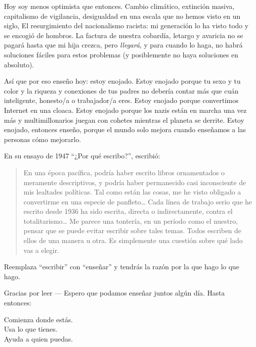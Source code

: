 Hoy soy menos optimista que entonces.
Cambio climático,
extinción masiva,
capitalismo de vigilancia,
desigualdad en una escala que no hemos visto en un siglo,
El resurgimiento del nacionalismo racista:
mi generación lo ha visto todo y se encogió de hombros.
La factura de nuestra cobardía, letargo y avaricia no se pagará hasta que mi hija crezca,
pero \emph{llegará},
y para cuando lo haga, no habrá soluciones fáciles para estos problemas
(y posiblemente no haya soluciones en absoluto).

Así que por eso enseño hoy:
estoy enojado.
Estoy enojado porque tu sexo y tu color y la riqueza y conexiones de tus padres
no debería contar más que cuán inteligente, honesto/a o trabajador/a eres.
Estoy enojado porque convertimos Internet en una cloaca.
Estoy enojado porque los nazis están en marcha una vez más
y multimillonarios juegan con cohetes mientras el planeta se derrite.
Estoy enojado,
entonces enseño,
porque el mundo solo mejora cuando enseñamos a las personas cómo mejorarlo.

En su ensayo de 1947 ``¿Por qué escribo?'',
 escribió:

\begin{quote}

  En una época pacífica, podría haber escrito libros ornamentados o meramente descriptivos,
  y podría haber permanecido casi inconsciente de mis lealtades políticas.
  Tal como están las cosas, me he visto obligado a convertirme en una especie de panfleto{\ldots}
  Cada línea de trabajo serio que he escrito desde 1936 ha sido escrita,
  directa o indirectamente,
  contra el totalitarismo{\ldots}
  Me parece una tontería,
  en un período como el nuestro,
  pensar que se puede evitar escribir sobre tales temas.
  Todos escriben de ellos de una manera u otra.
  Es simplemente una cuestión sobre qué lado vas a elegir.

\end{quote}

\noindent
Reemplaza ``escribir'' con ``enseñar'' y tendrás la razón por la que hago lo que hago.

\vspace{\baselineskip}

\noindent
Gracias por leer --- Espero que podamos enseñar juntos algún día.
Hasta entonces:

\begin{center}

Comienza donde estás. \\
Usa lo que tienes. \\
Ayuda a quien puedas.

\end{center}
